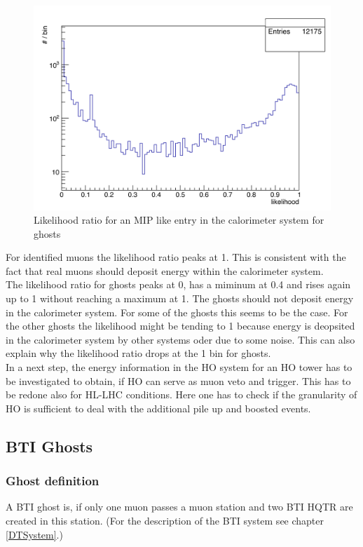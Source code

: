 \begin{figure}
\begin{minipage}[t]{0.95\textwidth}
\includegraphics[width=\textwidth]{Figures/scheuch/LikelihoodGhost.png}
\caption{Likelihood ratio for an MIP like entry in the calorimeter system for ghosts}
\label{LikelihoodGhost}
\end{minipage}
\end{figure}
For identified muons the likelihood ratio peaks at 1. This is consistent with the fact that real muons should deposit energy within the calorimeter system.\\
The likelihood ratio for ghosts peaks at 0, has a miminum at 0.4 and rises again up to 1 without reaching a maximum at 1. The ghosts should not deposit energy in the calorimeter system. For some of the ghosts this seems to be the case. For the other ghosts the likelihood might be tending to 1 because energy is deopsited in the calorimeter system by other systems oder due to some noise. This can also explain why the likelihood ratio drops at the 1 bin for ghosts.\\
In a next step, the energy information in the HO system for an HO tower has to be investigated to obtain, if HO can serve as muon veto and trigger. This has to be redone also for HL-LHC conditions. Here one has to check if the granularity of HO is sufficient to deal with the additional pile up and boosted events.
\subsection{BTI Ghosts}
\subsubsection{Ghost definition}
A BTI ghost is, if only one muon passes a muon station and two BTI HQTR are created in this station. (For the description of the BTI system see chapter \ref{DTSystem}.)
